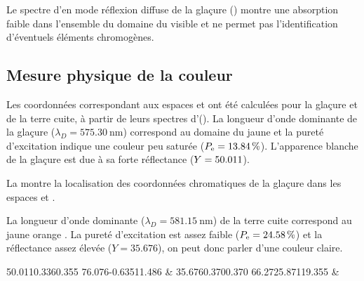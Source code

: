 Le spectre d'\AO en mode réflexion diffuse de la glaçure 
() montre une absorption faible dans l'ensemble 
du domaine du visible et ne permet pas l'identification d'éventuels 
éléments chromogènes.

\subsection{Mesure physique de la couleur}
Les coordonnées \trichros correspondant aux espaces \Yxy et \Lab ont 
été calculées pour la glaçure et de la terre cuite, à partir de leurs 
spectres d'\AO (). La longueur d'onde dominante de 
la glaçure ($\lambda_D=\SI{575.30}{\nm}$) correspond au domaine du 
jaune \autocite{Kelly_1976} et la pureté d'excitation indique une 
couleur peu saturée ($P_\text{e}=\SI{13.84}{\percent}$). L'apparence blanche 
de la glaçure est due à sa forte réflectance ($Y=\num{50.011}$).

La  montre la localisation des coordonnées 
chromatiques de la glaçure dans les espaces \Yxy et \Lab.

La longueur d'onde dominante ($\lambda_D=\SI{581.15}{\nm}$) de la 
terre cuite correspond au jaune orange \autocite{Kelly_1976}. La 
pureté d'excitation est assez faible ($P_\text{e}=\SI{24.58}{\percent}$) 
et la réflectance assez élevée ($Y=\num{35.676}$), on peut donc 
parler d'une couleur claire.

\begin{table}[hbt]
  \caption[\ -- Coordonnées chromatiques et longueur d'onde 
           dominante]
          {\legendeE.
           Coordonnées chromatiques dans les systèmes \Yxy et \Lab 
           et longueur d'onde dominante (illuminant D65, \ang{2},
           \SIrange{400}{700}{\nm}). (\up{\dag}\,\cite{Kelly_1976})}
  \label{saotab:6532}
  \begin{chrotab}
               {50.011}{0.336}{0.355}
               {76.076}{-0.635}{11.486} &
               {}
    \tabularnewline
               {35.676}{0.370}{0.370}
               {66.272}{5.871}{19.355} &
               {}
    \tabularnewline
  \end{chrotab}
\end{table}

